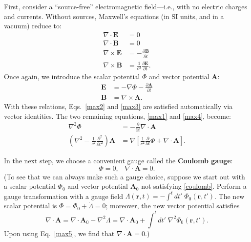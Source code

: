\documentclass[prx,12pt]{revtex4-2}
\begin{document}
First, consider a ``source-free'' electromagnetic field---i.e., with
no electric charges and currents.  Without sources, Maxwell's
equations (in SI units, and in a vacuum) reduce to:
\begin{align}
  \nabla\cdot \mathbf{E} &= 0 \label{max1} \\
  \nabla\cdot \mathbf{B} &= 0 \label{max2}\\
  \nabla\times \mathbf{E} &= -\frac{\partial \mathbf{B}}{\partial t} \label{max3}\\
  \nabla\times \mathbf{B} &= \frac{1}{c^2} \frac{\partial \mathbf{E}}{\partial t}.
  \label{max4}
\end{align}
Once again, we introduce the scalar potential $\Phi$ and vector
potential $\mathbf{A}$:
\begin{align}
  \mathbf{E} &= - \nabla \Phi - \frac{\partial\mathbf{A}}{\partial t}
  \label{Efield} \\
  \mathbf{B} &= \nabla \times \mathbf{A}.
  \label{Bfield}
\end{align}
With these relations, Eqs.~\eqref{max2} and \eqref{max3} are satisfied
automatically via vector identities.  The two remaining equations,
\eqref{max1} and \eqref{max4}, become:
\begin{align}
  \nabla^2 \Phi &= -\frac{\partial}{\partial t} \nabla \cdot \mathbf{A} \label{max5} \\
  \left(\nabla^2 - \frac{1}{c^2}\frac{\partial^2}{\partial t^2}\right)
  \mathbf{A} &= \nabla\left[\frac{1}{c^2}\frac{\partial}{\partial t}  \Phi + \nabla\cdot\mathbf{A}\right]. \label{max6}
\end{align}

In the next step, we choose a convenient gauge called the
\textbf{Coulomb gauge}:
\begin{equation}
  \Phi = 0, \;\;\; \nabla \cdot \mathbf{A} = 0.
  \label{coulomb}
\end{equation}
(To see that we can always make such a gauge choice, suppose we start
out with a scalar potential $\Phi_0$ and vector potential
$\mathbf{A}_0$ not satisfying \eqref{coulomb}.  Perform a gauge
transformation with a gauge field $\Lambda(\mathbf{r}, t) = - \int^t
dt'\; \Phi_0(\mathbf{r}, t')$.  The new scalar potential is $\Phi =
\Phi_0 + \dot{\Lambda} = 0$; moreover, the new vector potential
satisfies
\begin{equation}
  \nabla\cdot\mathbf{A} = \nabla\cdot \mathbf{A}_0 - \nabla^2 \Lambda
  = \nabla\cdot \mathbf{A}_0 + \int^t dt'\; \nabla^2\Phi_0(\mathbf{r}, t').
\end{equation}
Upon using Eq.~\eqref{max5}, we find that $\nabla\cdot\mathbf{A} =
0$.)
\end{document}
